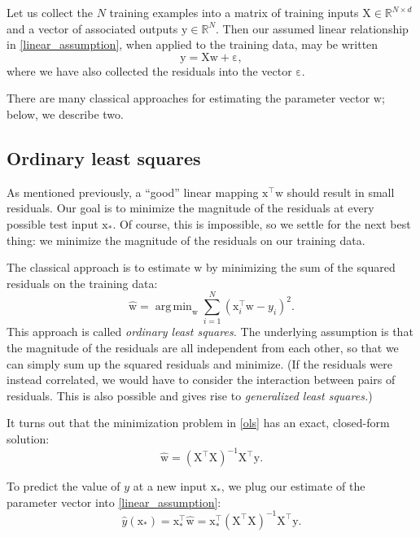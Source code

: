 \documentclass{article}
\newcommand{\inv}{^{-1}}
\newcommand{\trans}{^\top}
\newcommand{\mat}[1]{\bm{\mathrm{#1}}}
\renewcommand{\vec}[1]{\bm{\mathrm{#1}}}
\newcommand{\R}{\mathbb{R}}
\renewcommand{\epsilon}{\varepsilon}
\DeclareMathOperator*{\argmin}{arg\,min}
\begin{document}
Let us collect the $N$ training examples into a matrix of training
inputs $\vec{X} \in \R^{N \times d}$ and a vector of associated outputs
$\vec{y} \in \R^N$.  Then our assumed linear relationship in
\eqref{linear_assumption}, when applied to the training data, may be
written
\begin{equation*}
  \vec{y} = \mat{X}\vec{w} + \vec{\epsilon},
\end{equation*}
where we have also collected the residuals into the vector
$\vec{\epsilon}$.

There are many classical approaches for estimating the parameter
vector $\vec{w}$; below, we describe two.

\subsection*{Ordinary least squares}

As mentioned previously, a ``good'' linear mapping $\vec{x}\trans
\vec{w}$ should result in small residuals.  Our goal is to minimize
the magnitude of the residuals at every possible test input
$\vec{x}_\ast$.  Of course, this is impossible, so we settle for the
next best thing: we minimize the magnitude of the residuals on our
training data.

The classical approach is to estimate $\vec{w}$ by minimizing the sum of
the squared residuals on the training data:
\begin{equation}
  \label{ols}
  \hat{\vec{w}}
  =
  \argmin_{\vec{w}}
  \sum_{i = 1}^N
  (\vec{x}_i\trans \vec{w} - y_i)^2.
\end{equation}
This approach is called \emph{ordinary least squares.}  The underlying
assumption is that the magnitude of the residuals are all independent
from each other, so that we can simply sum up the squared residuals
and minimize.  (If the residuals were instead correlated, we would
have to consider the interaction between pairs of residuals.  This is
also possible and gives rise to \emph{generalized least squares.})

It turns out that the minimization problem in \eqref{ols} has an
exact, closed-form solution:
\begin{equation*}
  \hat{\vec{w}} = (\mat{X}\trans\mat{X})\inv \mat{X}\trans \vec{y}.
\end{equation*}

To predict the value of $y$ at a new input $\vec{x}_\ast$, we plug our
estimate of the parameter vector into \eqref{linear_assumption}:
\begin{equation*}
  \hat{y}(\vec{x}_\ast)
  =
  \vec{x}_\ast\trans \hat{\vec{w}} =
  \vec{x}_\ast\trans (\mat{X}\trans\mat{X})\inv \mat{X}\trans \vec{y}
  .
\end{equation*}
\end{document}
